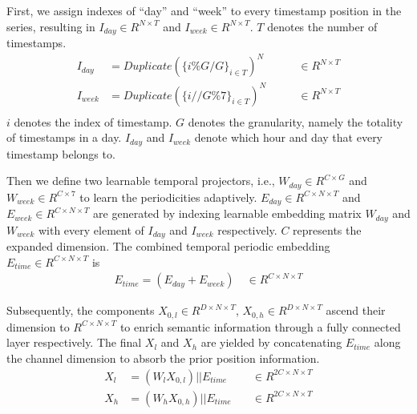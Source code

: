 \documentclass[final,12pt]{elsarticle}
\begin{document}
First, we assign indexes of ``day'' and ``week'' 
to every timestamp position in the series, 
resulting in 
$I_{day}  \in R^{N \times T}$ and 
$I_{week} \in R^{N \times T}$.  %
$T$ denotes the number of timestamps.
\begin{equation}
  \begin{aligned}
    I_{day}  &= Duplicate(\{i \% G / G  \}_{i \in T})^{N} 
             &\quad \quad \in R^{N \times T}  \\
    I_{week} &= Duplicate(\{i // G \% 7 \}_{i \in T})^{N} 
             &\quad \quad \in R^{N \times T}  \\
  \end{aligned}
\end{equation}
$i$ denotes the index of timestamp.
$G$ denotes the granularity, namely the totality of timestamps in a day.
$I_{day}$ and $I_{week}$ denote 
which hour and day that every timestamp belongs to.  %


Then we define two learnable temporal projectors, i.e., 
$W_{day}  \in R^{C \times G}$ and 
$W_{week} \in R^{C \times 7}$ 
to learn the periodicities adaptively.  %
$E_{day}  \in R^{C \times N \times T}$ and 
$E_{week} \in R^{C \times N \times T}$ 
are generated by indexing 
learnable embedding matrix $W_{day}$ and $W_{week}$ 
with every element of $I_{day}$ and $I_{week}$ respectively.  %
$C$ represents the expanded dimension.
The combined temporal periodic embedding 
$E_{time} \in R^{C \times N \times T}$ is 
\begin{equation}
  \begin{aligned}
    E_{time} = (E_{day} + E_{week}) \quad \in R^{C \times N \times T}
  \end{aligned}
\end{equation}  %


Subsequently, the components 
$X_{0, l} \in R^{D \times N \times T}$, 
$X_{0, h} \in R^{D \times N \times T}$ ascend their dimension to 
$R^{C \times N \times T}$ 
to enrich semantic information 
through a fully connected layer respectively.  %
The final $X_{l}$ and $X_{h}$ are yielded 
by concatenating $E_{time}$ along the channel dimension 
to absorb the prior position information.  %
\begin{equation}
  \begin{aligned}
    X_{l} &= (W_{l} X_{0, l}) || E_{time} 
          &\quad \in R^{2C \times N \times T}  \\
    X_{h} &= (W_{h} X_{0, h}) || E_{time} 
          &\quad \in R^{2C \times N \times T}  \\
  \end{aligned}
\end{equation}  %
\end{document}
